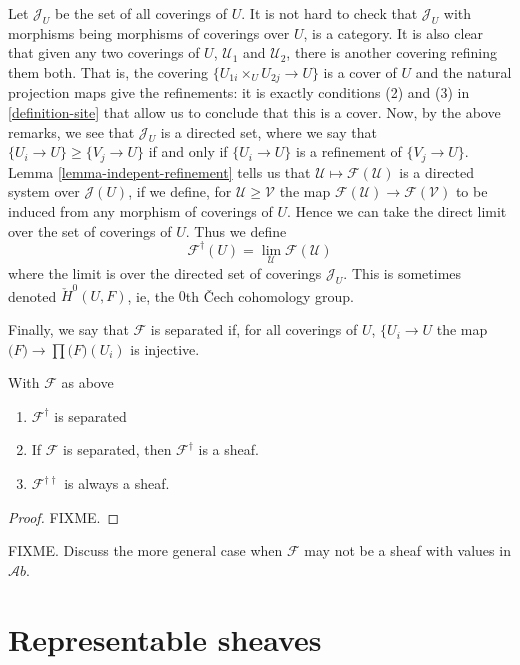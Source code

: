 \noindent
Let $\mathcal{J}_U$ be the set of all coverings of $U$. It is not hard to
check that $\mathcal{J}_U$ with morphisms being morphisms of coverings
over $U$, is a category. It is also clear that given any two coverings of $U$,
$\mathcal{U}_1$ and $\mathcal{U}_2$, there is another covering refining them
both. That is, the covering $\{U_{1i} \times_U U_{2j} \rightarrow U\}$ is a
cover of $U$ and the natural projection maps give the refinements: it is
exactly conditions (2) and (3) in \ref{definition-site} that allow us to conclude
that this is a cover. Now, by the above remarks, we see that $\mathcal{J}_U$
is a directed set, where we say that $\{U_i \to U\} \geq \{V_j \to U\}$ if 
and only if $\{U_i \to U\}$ is a refinement of $\{V_j \to U\}$. Lemma
\ref{lemma-indepent-refinement} tells us that $\mathcal{U} \mapsto
\mathcal{F}(\mathcal{U})$ is a directed system over $\mathcal{J}(U)$, if
we define, for $\mathcal{U} \geq \mathcal{V}$ the map 
$\mathcal{F}(\mathcal{U}) \to \mathcal{F}(\mathcal{V})$ to be induced from any
morphism of coverings of $U$. Hence we can take the direct limit over the set
of coverings of $U$. Thus we define 
$$
\mathcal{F}^\dagger(U) = \lim_{\mathcal{U}}\mathcal{F}(\mathcal{U})
$$
where the limit is over the directed set of coverings $\mathcal{J}_U$.
This is sometimes denoted $\check{H}^0(U, F)$, ie, the $0$th \v{C}ech
cohomology group. 

\smallskip\noindent
Finally, we say that $\mathcal{F}$ is separated if, for all coverings
of $U$, $\{U_i \rightarrow U$ the map 
$\mathcal(F) \rightarrow \prod \mathcal(F)(U_i)$ is injective.

\begin{theorem}
With $\mathcal{F}$ as above
\begin{enumerate}
\item $\mathcal{F}^\dagger$ is separated
\item If $\mathcal{F}$ is separated, then $\mathcal{F}^\dagger$ is a sheaf.
\item $\mathcal{F}^{\dagger\dagger}$ is always a sheaf.
\end{enumerate}
\end{theorem}

\begin{proof}
FIXME.
\end{proof}

\noindent
FIXME. Discuss the more general case when $\mathcal{F}$ may not be a sheaf with
values in $\mathcal{A}b$.

\section{Representable sheaves}
\label{section-representable-sheaves}

